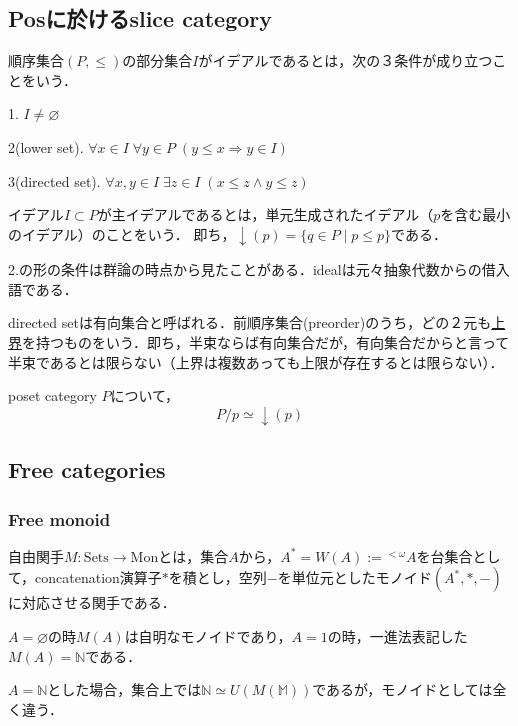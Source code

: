 \documentclass[uplatex, 12pt, dvipdfmx]{jsarticle}
\begin{document}
\subsection*{Posに於けるslice category}

\begin{definition*}
    順序集合$(P,\le)$の部分集合$I$がイデアルであるとは，次の３条件が成り立つことをいう．

    1. $I\ne\varnothing$

    2(lower set). $\forall x\in I\; \forall y\in P\; (y\le x\Rightarrow y\in I)$

    3(directed set). $\forall x,y\in I\; \exists z\in I\; (x\le z\land y\le z)$

    イデアル$I\subset P$が主イデアルであるとは，単元生成されたイデアル（$p$を含む最小のイデアル）のことをいう．
    即ち，$\downarrow(p)=\{q\in P\mid p\le p\}$である．
\end{definition*}
\begin{remark*}
    2.の形の条件は群論の時点から見たことがある．idealは元々抽象代数からの借入語である．

    directed setは有向集合と呼ばれる．前順序集合(preorder)のうち，どの２元も\underline{上界}を持つものをいう．即ち，半束ならば有向集合だが，有向集合だからと言って半束であるとは限らない（上界は複数あっても上限が存在するとは限らない）．
\end{remark*}

\begin{proposition*}
    poset category $P$について，
    \[ P/p \simeq \downarrow (p) \]
\end{proposition*}

\subsection{Free categories}

\subsubsection{Free monoid}

\begin{definition*}
    自由関手$M:\mathrm{Sets}\to\mathrm{Mon}$とは，集合$A$から，$A^*=W(A):={}^{<\omega}\!A$を台集合として，concatenation演算子$*$を積とし，空列$-$を単位元としたモノイド$(A^*,*,-)$に対応させる関手である．
\end{definition*}
\begin{remark*}
    $A=\varnothing$の時$M(A)$は自明なモノイドであり，$A=1$の時，一進法表記した$M(A)=\mathbb{N}$である．

    $A=\mathbb{N}$とした場合，集合上では$\mathbb{N}\simeq U(M(\mathbb{M}))$であるが，モノイドとしては全く違う．
\end{remark*}
\end{document}
